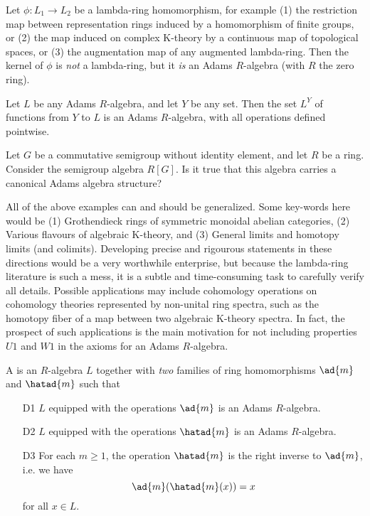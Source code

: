 \documentclass[a4paper]{article}
\begin{document}
\begin{example}
Let $\phi: L_1 \to L_2$ be a lambda-ring homomorphism, for example (1) the restriction map between representation rings induced by a homomorphism of finite groups, or (2) the map induced on complex K-theory by a continuous map of topological spaces, or (3) the augmentation map of any augmented lambda-ring. Then the kernel of $\phi$ is \emph{not} a lambda-ring, but it \emph{is} an Adams $R$-algebra (with $R$ the zero ring). 
\end{example}

\begin{example}
Let $L$ be any Adams $R$-algebra, and let $Y$ be any set. Then the set $L^Y$ of functions from $Y$ to $L$ is an Adams $R$-algebra, with all operations defined pointwise. 
\end{example}

\begin{exercise}
Let $G$ be a commutative semigroup without identity element, and let $R$ be a ring. Consider the semigroup algebra $R[G]$. Is it true that this algebra carries a canonical Adams algebra structure?
\end{exercise}

\begin{remark}
All of the above examples can and should be generalized. Some key-words here would be (1) Grothendieck rings of symmetric monoidal abelian categories, (2) Various flavours of algebraic K-theory, and (3) General limits and homotopy limits (and colimits). Developing precise and rigourous statements in these directions would be a very worthwhile enterprise, but because the lambda-ring literature is such a mess, it is a subtle and time-consuming task to carefully verify all details. Possible applications may include cohomology operations on cohomology theories represented by non-unital ring spectra, such as the homotopy fiber of a map between two algebraic K-theory spectra. In fact, the prospect of such applications is the main motivation for not including properties $U1$ and $W1$ in the axioms for an Adams $R$-algebra.
\end{remark}

\begin{definition}
A  is an $R$-algebra $L$ together with \emph{two} families of ring homomorphisms $\ad{m}$ and $\hatad{m}$ such that
\begin{itemize}
\item[D1] $L$ equipped with the operations $\ad{m}$ is an Adams $R$-algebra.
\item[D2] $L$ equipped with the operations $\hatad{m}$ is an Adams $R$-algebra.
\item[D3] For each $m \geq 1$, the operation $\hatad{m}$ is the right inverse to $\ad{m}$, i.e. we have 
$$     \ad{m} ( \hatad{m}  (x)) = x $$
for all $x \in L$.  
\end{itemize} 
\end{definition}
\end{document}
